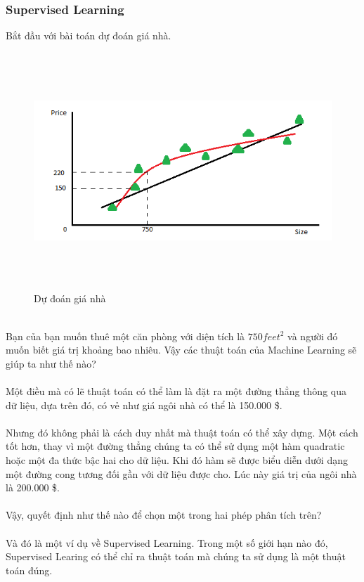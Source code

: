\subsubsection{Supervised Learning}
Bắt đầu với bài toán dự đoán giá nhà.\\
\begin{figure}[h!]
  	\centering
	\includegraphics[width=5in,height=3.5in,keepaspectratio=true]{SoDoGiaNha.png}
	\caption{Dự đoán giá nhà}
\end{figure}\\
Bạn của bạn muốn thuê một căn phòng với diện tích là $750 feet^2$ và người đó
muốn biết giá trị khoảng bao nhiêu. Vậy các thuật toán của Machine Learning sẽ
giúp ta như thế nào?\\\\
Một điều mà có lẽ thuật toán có thể làm là đặt ra một
đường thẳng thông qua dữ liệu, dựa trên đó, có vẻ như giá ngôi nhà có thể là
150.000 \$.\\\\
Nhưng đó không phải là cách duy nhất mà thuật toán có thể xây dựng. Một cách tốt
hơn, thay vì một đường thẳng chúng ta có thể sử dụng một hàm quadratic hoặc một
đa thức bậc hai cho dữ liệu. Khi đó hàm sẽ được biểu diễn dưới dạng một đường
cong tương đối gần với dữ liệu được cho. Lúc này giá trị của ngôi nhà là 200.000
\$.\\\\
Vậy, quyết định như thế nào để chọn một trong hai phép phân tích trên?\\\\
Và đó là một ví dụ về Supervised Learning. Trong một số giới hạn nào đó,
Supervised Learing có thể chỉ ra thuật toán mà chúng ta sử dụng là một thuật
toán đúng.
